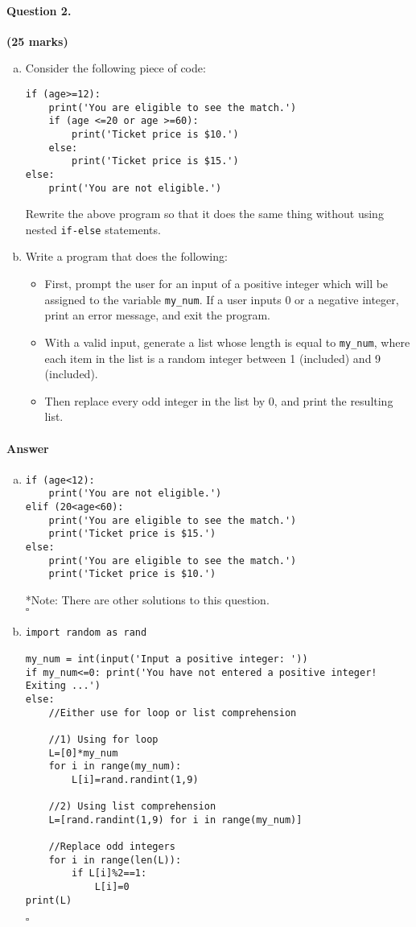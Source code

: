 \documentclass[12pt]{article}
\newcommand{\EOQ}{\hfill $\square$}
\begin{document}
\paragraph{Question 2.} \hfill {\bf (25 marks)}
\begin{enumerate}[(a)]
\item Consider the following piece of code:
\begin{verbatim}
if (age>=12):
    print('You are eligible to see the match.')
    if (age <=20 or age >=60):
        print('Ticket price is $10.')
    else:
        print('Ticket price is $15.')
else:
    print('You are not eligible.')
\end{verbatim}
Rewrite the above program so that it does the same thing without using nested \verb|if-else| statements.
\item Write a program that does the following:
\begin{itemize}
\item First, prompt the user for an input of a positive integer which will be assigned to the variable \verb|my_num|. If a user inputs $0$ or a negative integer, print an error message, and exit the program.
\item With a valid input, generate a list whose length is equal to \verb|my_num|, where each item in the list is a random integer between 1 (included) and 9 (included).
\item Then replace every odd integer in the list by 0, and print the resulting list.
\end{itemize}
\end{enumerate}
\paragraph{Answer}
\begin{enumerate}[(a)]
\item \begin{verbatim}
if (age<12):
    print('You are not eligible.')
elif (20<age<60):
    print('You are eligible to see the match.')
    print('Ticket price is $15.')
else:
    print('You are eligible to see the match.')
    print('Ticket price is $10.')
\end{verbatim}

*Note: There are other solutions to this question.\\\mbox{}\EOQ
\item \begin{verbatim}
import random as rand

my_num = int(input('Input a positive integer: '))
if my_num<=0: print('You have not entered a positive integer! Exiting ...')
else:
    //Either use for loop or list comprehension
	
    //1) Using for loop
    L=[0]*my_num
    for i in range(my_num):
        L[i]=rand.randint(1,9)
    
    //2) Using list comprehension
    L=[rand.randint(1,9) for i in range(my_num)]
    
    //Replace odd integers
    for i in range(len(L)):
        if L[i]%2==1:
            L[i]=0
print(L)
\end{verbatim}
\EOQ
\end{enumerate}
\clearpage
\end{document}
